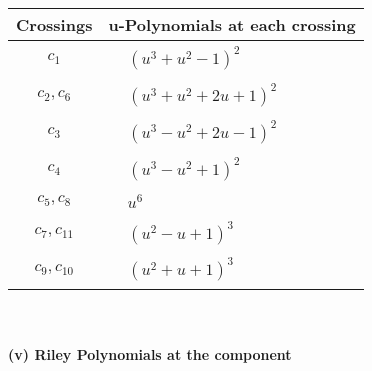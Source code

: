 \documentclass[1p]{elsarticle_modified}
\theoremstyle{definition}
\begin{document}
\begin{tabular}{m{50pt}|m{274pt}}
Crossings & \hspace{64pt}u-Polynomials at each crossing \\
\hline $$\begin{aligned}c_{1}\end{aligned}$$&$\begin{aligned}
&(u^3+u^2-1)^2
\end{aligned}$\\
\hline $$\begin{aligned}c_{2},c_{6}\end{aligned}$$&$\begin{aligned}
&(u^3+u^2+2 u+1)^2
\end{aligned}$\\
\hline $$\begin{aligned}c_{3}\end{aligned}$$&$\begin{aligned}
&(u^3- u^2+2 u-1)^2
\end{aligned}$\\
\hline $$\begin{aligned}c_{4}\end{aligned}$$&$\begin{aligned}
&(u^3- u^2+1)^2
\end{aligned}$\\
\hline $$\begin{aligned}c_{5},c_{8}\end{aligned}$$&$\begin{aligned}
&u^6
\end{aligned}$\\
\hline $$\begin{aligned}c_{7},c_{11}\end{aligned}$$&$\begin{aligned}
&(u^2- u+1)^3
\end{aligned}$\\
\hline $$\begin{aligned}c_{9},c_{10}\end{aligned}$$&$\begin{aligned}
&(u^2+u+1)^3
\end{aligned}$\\
\hline
\end{tabular}\\~\\
\newpage\renewcommand{\arraystretch}{1}
\flushleft \textbf{(v) Riley Polynomials at the component}\newline \\
\end{document}
